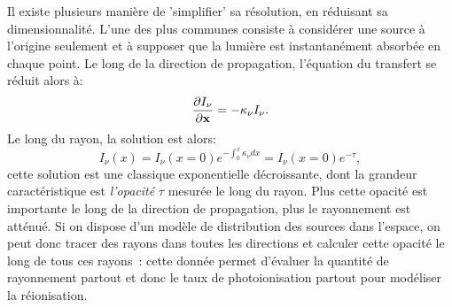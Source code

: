 Il existe plusieurs manière de 'simplifier' sa résolution, en réduisant sa dimensionnalité. L'une des plus communes consiste à considérer une source à l'origine seulement et à supposer que la lumière est instantanément absorbée en chaque point. Le long de la direction de propagation, l'équation du transfert se réduit alors à:
\begin{equation}
 \frac{\partial I_\nu}{\partial {\bf x}}=- \kappa_\nu I_\nu.
\end{equation}
Le long du rayon, la solution est alors:
\begin{equation}
I_\nu(x)=I_\nu(x=0)e^{-\int_0^x \kappa_\nu dx}=I_\nu(x=0)e^{-\tau},
\end{equation}
cette solution est une classique exponentielle décroissante, dont la grandeur caractéristique est \textit{l'opacité} $\tau$ mesurée le long du rayon. Plus cette opacité est importante le long de la direction de propagation, plus le rayonnement est atténué. Si on dispose d'un modèle de distribution des sources dans l'espace, on peut donc tracer des rayons dans toutes les directions et calculer cette opacité le long de tous ces rayons~: cette donnée permet d'évaluer la quantité de rayonnement partout et donc le taux de photoionisation partout pour modéliser la réionisation.

